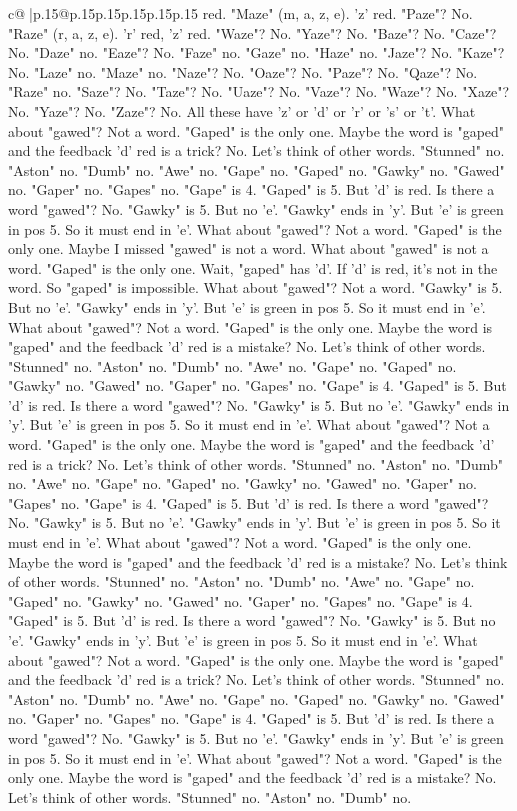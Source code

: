 \documentclass{article}
\begin{document}
{\begin{supertabular}{c@{$\;$}|p{.15\linewidth}@{}p{.15\linewidth}p{.15\linewidth}p{.15\linewidth}p{.15\linewidth}p{.15\linewidth}}
{{{red. "Maze" (m, a, z, e). 'z' red. "Paze"? No. "Raze" (r, a, z, e). 'r' red, 'z' red. "Waze"? No. "Yaze"? No. "Baze"? No. "Caze"? No. "Daze" no. "Eaze"? No. "Faze" no. "Gaze" no. "Haze" no. "Jaze"? No. "Kaze"? No. "Laze" no. "Maze" no. "Naze"? No. "Oaze"? No. "Paze"? No. "Qaze"? No. "Raze" no. "Saze"? No. "Taze"? No. "Uaze"? No. "Vaze"? No. "Waze"? No. "Xaze"? No. "Yaze"? No. "Zaze"? No. All these have 'z' or 'd' or 'r' or 's' or 't'. What about "gawed"? Not a word. "Gaped" is the only one. Maybe the word is "gaped" and the feedback 'd' red is a trick? No. Let's think of other words. "Stunned" no. "Aston" no. "Dumb" no. "Awe" no. "Gape" no. "Gaped" no. "Gawky" no. "Gawed" no. "Gaper" no. "Gapes" no. "Gape" is 4. "Gaped" is 5. But 'd' is red. Is there a word "gawed"? No. "Gawky" is 5. But no 'e'. "Gawky" ends in 'y'. But 'e' is green in pos 5. So it must end in 'e'. What about "gawed"? Not a word. "Gaped" is the only one. Maybe I missed "gawed" is not a word. What about "gawed" is not a word. "Gaped" is the only one. Wait, "gaped" has 'd'. If 'd' is red, it's not in the word. So "gaped" is impossible. What about "gawed"? Not a word. "Gawky" is 5. But no 'e'. "Gawky" ends in 'y'. But 'e' is green in pos 5. So it must end in 'e'. What about "gawed"? Not a word. "Gaped" is the only one. Maybe the word is "gaped" and the feedback 'd' red is a mistake? No. Let's think of other words. "Stunned" no. "Aston" no. "Dumb" no. "Awe" no. "Gape" no. "Gaped" no. "Gawky" no. "Gawed" no. "Gaper" no. "Gapes" no. "Gape" is 4. "Gaped" is 5. But 'd' is red. Is there a word "gawed"? No. "Gawky" is 5. But no 'e'. "Gawky" ends in 'y'. But 'e' is green in pos 5. So it must end in 'e'. What about "gawed"? Not a word. "Gaped" is the only one. Maybe the word is "gaped" and the feedback 'd' red is a trick? No. Let's think of other words. "Stunned" no. "Aston" no. "Dumb" no. "Awe" no. "Gape" no. "Gaped" no. "Gawky" no. "Gawed" no. "Gaper" no. "Gapes" no. "Gape" is 4. "Gaped" is 5. But 'd' is red. Is there a word "gawed"? No. "Gawky" is 5. But no 'e'. "Gawky" ends in 'y'. But 'e' is green in pos 5. So it must end in 'e'. What about "gawed"? Not a word. "Gaped" is the only one. Maybe the word is "gaped" and the feedback 'd' red is a mistake? No. Let's think of other words. "Stunned" no. "Aston" no. "Dumb" no. "Awe" no. "Gape" no. "Gaped" no. "Gawky" no. "Gawed" no. "Gaper" no. "Gapes" no. "Gape" is 4. "Gaped" is 5. But 'd' is red. Is there a word "gawed"? No. "Gawky" is 5. But no 'e'. "Gawky" ends in 'y'. But 'e' is green in pos 5. So it must end in 'e'. What about "gawed"? Not a word. "Gaped" is the only one. Maybe the word is "gaped" and the feedback 'd' red is a trick? No. Let's think of other words. "Stunned" no. "Aston" no. "Dumb" no. "Awe" no. "Gape" no. "Gaped" no. "Gawky" no. "Gawed" no. "Gaper" no. "Gapes" no. "Gape" is 4. "Gaped" is 5. But 'd' is red. Is there a word "gawed"? No. "Gawky" is 5. But no 'e'. "Gawky" ends in 'y'. But 'e' is green in pos 5. So it must end in 'e'. What about "gawed"? Not a word. "Gaped" is the only one. Maybe the word is "gaped" and the feedback 'd' red is a mistake? No. Let's think of other words. "Stunned" no. "Aston" no. "Dumb" no. }}}
\end{supertabular}}
\end{document}
